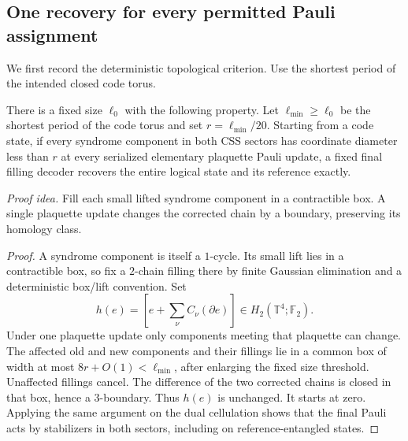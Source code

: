 \subsection{One recovery for every permitted Pauli assignment}

We first record the deterministic topological criterion. Use the shortest period of the intended closed code torus.

\begin{lemma}\label{q:homology}
There is a fixed size \(\ell_0\) with the following property. Let \(\ell_{\min}\ge\ell_0\) be the shortest period of the code torus and set \(r=\ell_{\min}/20\).
Starting from a code state, if every syndrome component in both CSS
sectors has coordinate diameter less than \(r\) at every serialized
elementary plaquette Pauli update, a fixed final filling decoder
recovers the entire logical state and its reference exactly.
\end{lemma}
\par\noindent\emph{Proof idea.} Fill each small lifted syndrome component in a contractible box. A single plaquette update changes the corrected chain by a boundary, preserving its homology class.
\begin{proof}
A syndrome component is itself a \(1\)-cycle. Its small lift lies
in a contractible box, so fix a \(2\)-chain filling there by finite
Gaussian elimination and a deterministic box/lift convention. Set
\[
 h(e)=\left[e+\sum_\nu C_\nu(\partial e)\right]
 \in H_2(\mathbb T^4;\mathbb F_2).
\]
Under one plaquette update only components meeting that plaquette
can change. The affected old and new components and their fillings
lie in a common box of width at most \(8r+O(1)<\ell_{\min}\), after
enlarging the fixed size threshold. Unaffected fillings cancel.
The difference of the two corrected chains is closed in that box,
hence a \(3\)-boundary. Thus \(h(e)\) is unchanged. It starts at
zero. Applying the same argument on the dual cellulation shows that
the final Pauli acts by stabilizers in both sectors, including on
reference-entangled states.
\end{proof}

